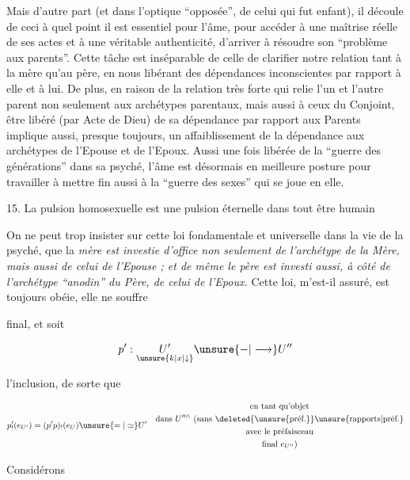 Mais d'autre part (et dans l'optique ``opposée'', de celui qui fut enfant), il découle de ceci à quel point il est essentiel pour l'âme, pour accéder à une maîtrise réelle de ses actes et à une véritable authenticité, d'arriver à résoudre son ``problème aux parents''. Cette tâche est inséparable de celle de clarifier notre relation tant à la mère qu'au père, en nous libérant des dépendances inconscientes par rapport à elle et à lui. De plus, en raison de la relation très forte qui relie l'un et l'autre parent non seulement aux archétypes parentaux, mais aussi à ceux du Conjoint, être libéré (par Acte de Dieu) de sa dépendance par rapport aux Parents implique aussi, presque toujours, un affaiblissement de la dépendance aux archétypes de l'Epouse et de l'Epoux. Aussi une fois libérée de la ``guerre des générations'' dans sa psyché, l'âme est désormais en meilleure posture pour travailler à mettre fin aussi à la ``guerre des sexes'' qui se joue en elle.

15. La pulsion homosexuelle est une pulsion éternelle dans tout être humain

On ne peut trop insister sur cette loi fondamentale et universelle dans la vie de la psyché, que la \textit{mère est investie d'office non seulement de l'archétype de la Mère, mais aussi de celui de l'Epouse ; et de même le père est investi aussi, à côté de l'archétype ``anodin'' du Père, de celui de l'Epoux.} Cette loi, m'est-il assuré, est toujours obéie, elle ne souffre


final, et soit

\[
 p':\underset{\unsure{k|x|\downarrow}}{U'}\unsure{\mathbin{-}|\longrightarrow} U''
\]

l'inclusion, de sorte que

\[
 p'_!(e_{U'})=(p'p)_!(e_U)\unsure{=|\simeq} U'
 \quad\begin{gathered}\text{en tant qu'objet}\\
 \text{dans }U''^\wedge\ \text{(sans \deleted{\unsure{préf.}}\unsure{rapports|préf.}}\\
 \text{avec le préfaisceau}\\
 \text{final }e_{U''}\text{)}\end{gathered}
\]

Considérons


